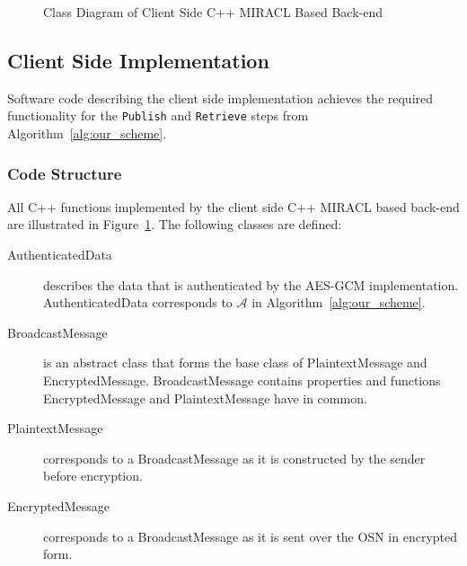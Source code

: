 \begin{figure}
{{
    }}
    \caption{Class Diagram of Client Side C++ MIRACL Based Back-end}
    \label{fig:class_client_side}
\end{figure}
\subsection{Client Side Implementation}
Software code describing the client side implementation achieves the required functionality for the \texttt{Publish} and \texttt{Retrieve} steps from Algorithm~\ref{alg:our_scheme}.

\subsubsection{Code Structure}
All C++ functions implemented by the client side C++ MIRACL based back-end are illustrated in Figure~\ref{fig:class_client_side}. The following classes are defined:
\begin{description}
 \item[AuthenticatedData] describes the data that is authenticated by the AES-GCM implementation. AuthenticatedData corresponds to $\mathcal{A}$ in Algorithm~\ref{alg:our_scheme}.
 \item[BroadcastMessage] is an abstract class that forms the base class of PlaintextMessage and EncryptedMessage. BroadcastMessage contains properties and functions EncryptedMessage and PlaintextMessage have in common.
 \item[PlaintextMessage] corresponds to a BroadcastMessage as it is constructed by the sender before encryption.
 \item[EncryptedMessage] corresponds to a BroadcastMessage as it is sent over the OSN in encrypted form.
\end{description}

